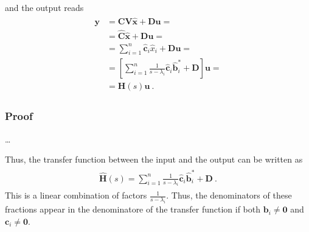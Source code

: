 \documentclass[letterpaper,10pt,english]{jupyterBook}
\begin{document}
\sphinxAtStartPar
and the output reads
\begin{equation*}
\begin{split}\begin{aligned}
 \mathbf{y}
 & = \mathbf{C} \mathbf{V} \hat{\mathbf{x}} + \mathbf{D} \mathbf{u} = \\
 & = \hat{\mathbf{C}} \hat{\mathbf{x}} + \mathbf{D} \mathbf{u} = \\
 & = \sum_{i=1}^{n} \hat{\mathbf{c}}_i \hat{x}_i + \mathbf{D} \mathbf{u} = \\
 & = \left[ \sum_{i=1}^{n} \frac{1}{s-\lambda_i} \hat{\mathbf{c}}_i \hat{\mathbf{b}}^*_i + \mathbf{D} \right] \mathbf{u} = \\
 & = \mathbf{H}(s) \mathbf{u} \ .
\end{aligned}\end{split}
\end{equation*}\subsubsection*{Proof}

\sphinxAtStartPar
…

\sphinxAtStartPar
{} Thus, the transfer function between the input and the output can be written as
\begin{equation*}
\begin{split}\begin{aligned}
  \hat{\mathbf{H}}(s) = \sum_{i=1}^{n} \frac{1}{s-\lambda_i} \hat{\mathbf{c}}_i \hat{\mathbf{b}}^*_i + \mathbf{D} \ . 
\end{aligned}\end{split}
\end{equation*}
\sphinxAtStartPar
This is a linear combination of factors \(\frac{1}{s - \lambda_i}\). Thus, the denominators of these fractions appear in the denominatore of the transfer function if both \(\mathbf{b}_i \ne \mathbf{0}\) and \(\mathbf{c}_i \ne \mathbf{0}\).  
\end{document}

